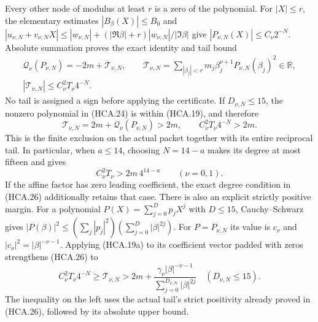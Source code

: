 Every other node of modulus at least $r$ is a zero of the
polynomial. For $|X|\leq r$, the elementary estimates
$|B_\beta(X)|\leq B_0$ and
$|u_{\nu,N}+v_{\nu,N}X|\leq|w_{\nu,N}|+
(|\Re\beta|+r)|w_{\nu,N}|/|\Im\beta|$ give
$|P_{\nu,N}(X)|\leq C_\nu2^{-N}$. Absolute summation proves
the exact identity and tail bound
\[
 \begin{gathered}
 \mathcal Q_\nu(P_{\nu,N})=-2m+\mathcal T_{\nu,N},\qquad
 \mathcal T_{\nu,N}=\sum_{|\beta_j|<r}
                  m_j\beta_j^{\nu+1}P_{\nu,N}(\beta_j)^2\in\mathbb{R},\\
 |\mathcal T_{\nu,N}|\leq C_\nu^2T_\nu4^{-N}.
 \end{gathered}
 \tag{HCA.25}
\]
No tail is assigned a sign before applying the certificate.
If $D_{\nu,N}\leq15$, the nonzero polynomial in (HCA.24) is
within (HCA.19), and therefore
\[
 \boxed{\mathcal T_{\nu,N}=2m+\mathcal Q_\nu(P_{\nu,N})>2m,
 \qquad C_\nu^2T_\nu4^{-N}>2m.}
 \tag{HCA.26}
\]
This is the finite exclusion on the actual packet together with its
entire reciprocal tail. In particular, when $a\leq14$, choosing
$N=14-a$ makes its degree at most fifteen and gives
\[
 C_\nu^2T_\nu>2m\,4^{14-a}\qquad(\nu=0,1).
 \tag{HCA.27}
\]
If the affine factor has zero leading coefficient, the exact
degree condition in (HCA.26) additionally retains that case.
There is also an explicit strictly positive margin. For a polynomial
$P(X)=\sum_{j=0}^D p_jX^j$ with $D\leq15$,
Cauchy--Schwarz gives
$|P(\beta)|^2\leq(\sum_j|p_j|^2)(\sum_{j=0}^D|\beta|^{2j})$.
For $P=P_{\nu,N}$ its value is $c_\nu$ and
$|c_\nu|^2=|\beta|^{-\nu-1}$. Applying (HCA.19a) to its
coefficient vector padded with zeros strengthens (HCA.26) to
\[
 \boxed{C_\nu^2T_\nu4^{-N}\geq\mathcal T_{\nu,N}
 >2m+\frac{\gamma_\nu|\beta|^{-\nu-1}}
               {\sum_{j=0}^{D_{\nu,N}}|\beta|^{2j}}
 \quad(D_{\nu,N}\leq15).}
 \tag{HCA.27a}
\]
The inequality on the left uses the actual tail's strict positivity
already proved in (HCA.26), followed by its absolute upper bound.

